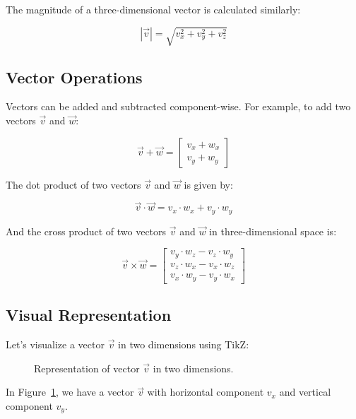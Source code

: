 \documentclass[a4paper,12pt]{book}
\newcounter{example}
\begin{document}
The magnitude of a three-dimensional vector is calculated similarly:

\[
|\vec{v}| = \sqrt{v_x^2 + v_y^2 + v_z^2}
\]

\subsection{Vector Operations}

Vectors can be added and subtracted component-wise. For example, to add two vectors $\vec{v}$ and $\vec{w}$:

\[
\vec{v} + \vec{w} = \begin{bmatrix}
v_x + w_x \\
v_y + w_y
\end{bmatrix}
\]

The dot product of two vectors $\vec{v}$ and $\vec{w}$ is given by:

\[
\vec{v} \cdot \vec{w} = v_x \cdot w_x + v_y \cdot w_y
\]

And the cross product of two vectors $\vec{v}$ and $\vec{w}$ in three-dimensional space is:

\[
\vec{v} \times \vec{w} = \begin{bmatrix}
v_y \cdot w_z - v_z \cdot w_y \\
v_z \cdot w_x - v_x \cdot w_z \\
v_x \cdot w_y - v_y \cdot w_x
\end{bmatrix}
\]

\subsection{Visual Representation}

Let's visualize a vector $\vec{v}$ in two dimensions using TikZ:

\begin{figure}[H]
    \centering
    \caption{Representation of vector $\vec{v}$ in two dimensions.}
    \label{fig:vector_representation}
\end{figure}

In Figure~\ref{fig:vector_representation}, we have a vector $\vec{v}$ with horizontal component $v_x$ and vertical component $v_y$.
\end{document}
